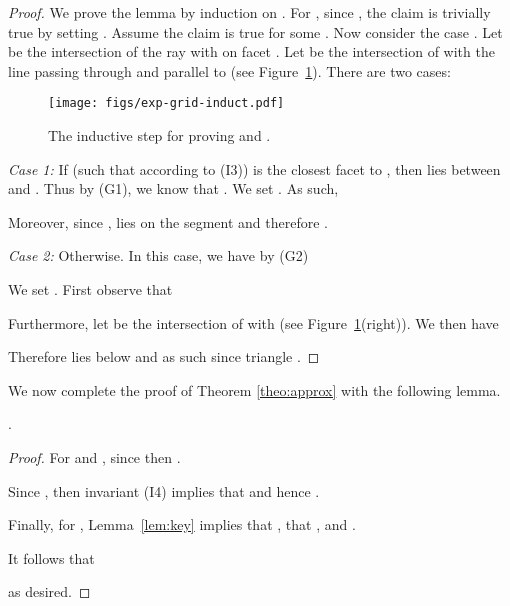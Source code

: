 \documentclass[11pt]{myclass}
\begin{document}
\begin{proof}
We prove the lemma by induction on . For ,  since , the claim is trivially true by setting .  Assume the claim is true for some .  Now consider the case .  Let  be the intersection of the ray  with  on facet . 
Let  be the intersection of  with the line passing through  and parallel to  (see Figure~\ref{fig:induction}). There are two cases:
 
 \begin{figure}[htb!]
\begin{center}
\texttt{[image: figs/exp-grid-induct.pdf]}
\end{center}
\caption{The inductive step for proving  and .}
\label{fig:induction}
\end{figure}
 
 \smallskip 
 {\em Case 1:} If   (such that  according to (I3)) is the closest facet to , then  lies between  and .  Thus by (G1), we know that  . We set . As such, 

Moreover, since ,  lies on the segment  and therefore .

 \smallskip  
 {\em Case 2:} Otherwise. In this case, we have by (G2)
 
We set . First observe that

Furthermore, let  be the intersection of  with  (see Figure~\ref{fig:induction}(right)). We then have

  Therefore  lies below  and as such  since triangle .  
\end{proof}

We now complete the proof of Theorem \ref{theo:approx} with the following lemma.

\begin{lemma}
.  \end{lemma}

\begin{proof}
For  and , since  then .    

Since , then invariant (I4) implies that  and hence .  

Finally, for , Lemma~\ref{lem:key} implies that  , that , and . 

It follows that

as desired.
\end{proof}
\end{document}

